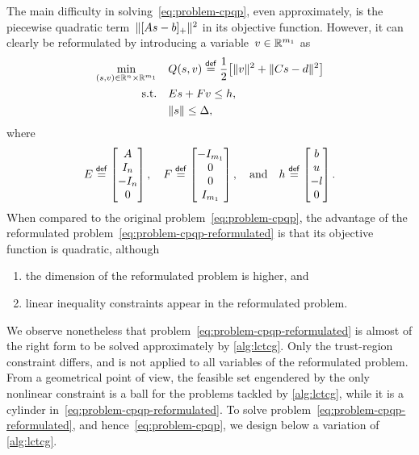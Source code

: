 The main difficulty in solving~\cref{eq:problem-cpqp}, even approximately, is the piecewise quadratic term~$\norm{\posp{A \sstep - b}}^2$ in its objective function.
However, it can clearly be reformulated by introducing a variable~$v \in \mathbb{R}^{m_1}$ as
\begin{subequations}
    \label{eq:problem-cpqp-reformulated}
    \begin{align}
        \min_{(\sstep, v) \in \R^n \times \R^{m_1}} & \quad Q(\sstep, v) \eqdef \frac{1}{2} \big[ \norm{v}^2 + \norm{C \sstep - d}^2 \big]\\
        \text{s.t.}                                 & \quad E \sstep + F v \le h,\\
                                                    & \quad \norm{\sstep} \le \rad,
    \end{align}
\end{subequations}
where
\begin{equation*}
    E \mathrel{\stackrel{\mathsf{def}}{=}}
    \begin{bmatrix}
        A\\
        I_n\\
        -I_n\\
        0
    \end{bmatrix}, \quad
    F \mathrel{\stackrel{\mathsf{def}}{=}}
    \begin{bmatrix}
        -I_{m_1}\\
        0\\
        0\\
        I_{m_1}
    \end{bmatrix}, \quad \text{and} \quad
    h \mathrel{\stackrel{\mathsf{def}}{=}}
    \begin{bmatrix}
        b\\
        u\\
        -l\\
        0
    \end{bmatrix}.
\end{equation*}
When compared to the original problem~\cref{eq:problem-cpqp}, the advantage of the reformulated problem~\cref{eq:problem-cpqp-reformulated} is that its objective function is quadratic, although
\begin{enumerate}
    \item the dimension of the reformulated problem is higher, and
    \item linear inequality constraints appear in the reformulated problem.
\end{enumerate}

We observe nonetheless that problem~\cref{eq:problem-cpqp-reformulated} is almost of the right form to be solved approximately by \cref{alg:lctcg}.
Only the trust-region constraint differs, and is not applied to all variables of the reformulated problem.
From a geometrical point of view, the feasible set engendered by the only nonlinear constraint is a ball for the problems tackled by \cref{alg:lctcg}, while it is a cylinder in~\cref{eq:problem-cpqp-reformulated}.
To solve problem~\cref{eq:problem-cpqp-reformulated}, and hence~\cref{eq:problem-cpqp}, we design below a variation of \cref{alg:lctcg}.

